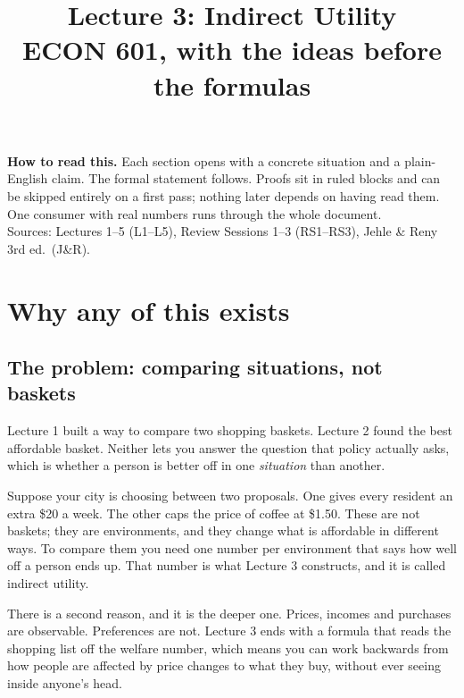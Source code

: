 \documentclass[11pt,letterpaper]{article}
\title{\vspace{-2.2em}\textbf{Lecture 3: Indirect Utility}\\[0.3em]
\large ECON 601, with the ideas before the formulas}
\author{}
\date{}
\theoremstyle{definition}
\theoremstyle{plain}
\begin{document}
\maketitle
\vspace{-3em}
\begin{center}
\small \textbf{How to read this.} Each section opens with a concrete situation and a plain-English
claim. The formal statement follows. Proofs sit in ruled blocks and can be skipped entirely on a
first pass; nothing later depends on having read them. One consumer with real numbers runs through
the whole document.\\[0.4em]
Sources: Lectures 1--5 (L1--L5), Review Sessions 1--3 (RS1--RS3), Jehle \& Reny 3rd ed.\ (J\&R).
\end{center}
\vspace{0.8em}

{\small\tableofcontents}
\vspace{1em}

\section{Why any of this exists}

\subsection{The problem: comparing situations, not baskets}

Lecture 1 built a way to compare two shopping baskets. Lecture 2 found the best affordable basket.
Neither lets you answer the question that policy actually asks, which is whether a person is better
off in one \emph{situation} than another.

Suppose your city is choosing between two proposals. One gives every resident an extra \$20 a week.
The other caps the price of coffee at \$1.50. These are not baskets; they are environments, and they
change what is affordable in different ways. To compare them you need one number per environment
that says how well off a person ends up. That number is what Lecture 3 constructs, and it is called
indirect utility.

There is a second reason, and it is the deeper one. Prices, incomes and purchases are observable.
Preferences are not. Lecture 3 ends with a formula that reads the shopping list off the welfare
number, which means you can work backwards from how people are affected by price changes to what
they buy, without ever seeing inside anyone's head.
\end{document}
